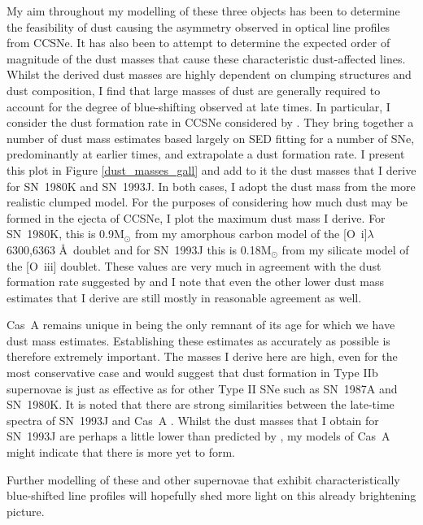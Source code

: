 My aim throughout my modelling of these three objects has been to determine the feasibility of dust causing the asymmetry observed in optical line profiles from CCSNe.  It has also been to attempt to determine the expected order of magnitude of the dust masses that cause these characteristic dust-affected lines.  Whilst the derived dust masses are highly dependent on clumping structures and dust composition, I find that large masses of dust are generally required to account for the degree of blue-shifting observed at late times.  In particular, I consider the dust formation rate in CCSNe considered by \citet{Gall2014}.  They bring together a number of dust mass estimates based largely on SED fitting for a number of SNe, predominantly at earlier times, and extrapolate a dust formation rate.  I present this plot in Figure \ref{dust_masses_gall} and add to it the dust masses that I derive for SN~1980K and SN~1993J.  In both cases, I adopt the dust mass from the more realistic clumped model.  For the purposes of considering how much dust may be formed in the ejecta of CCSNe, I plot the maximum dust mass I derive.  For SN~1980K, this is 0.9M$_{\odot}$ from my amorphous carbon model of the [O~{\sc i}]$\lambda$6300,6363 \AA\ doublet and for SN~1993J this is 0.18M$_{\odot}$ from my silicate model of the [O~{\sc iii}] doublet.  These values are very much in agreement with the dust formation rate suggested by \citet{Gall2014} and I note that even the other lower dust mass estimates that I derive are still mostly in reasonable agreement as well.

Cas~A remains unique in being the only remnant of its age for which we have dust mass estimates.  Establishing these estimates as accurately as possible is therefore extremely important.  The masses I derive here are high, even for the most conservative case and would suggest that dust formation in Type IIb supernovae is just as effective as for other Type II SNe such as SN~1987A and SN~1980K.  It is noted that there are strong similarities between the late-time spectra of SN~1993J and Cas~A \citep{Milisavljevic2012}.  Whilst the dust masses that I obtain for SN~1993J are perhaps a little lower than predicted by \citet{Gall2014}, my models of Cas~A might indicate that there is more yet to form.

Further modelling of these and other supernovae that exhibit characteristically blue-shifted line profiles will hopefully shed more light on this already brightening picture.

